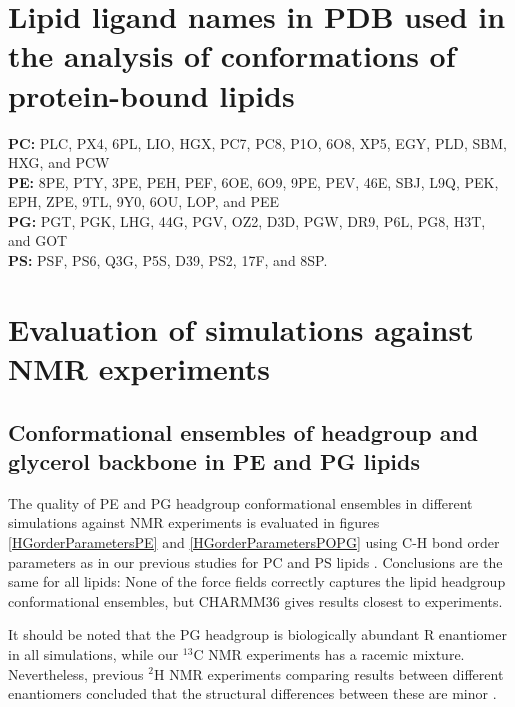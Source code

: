 \documentclass[journal=jpcbfk]{achemso}
\begin{document}
\clearpage
\section{Lipid ligand names in PDB used in the analysis of conformations of protein-bound lipids}
{\bf PC:} PLC, PX4, 6PL, LIO, HGX, PC7, PC8, P1O, 6O8, XP5, EGY, PLD, SBM, HXG, and PCW \\
{\bf PE:} 8PE, PTY, 3PE, PEH, PEF, 6OE, 6O9, 9PE, PEV, 46E, SBJ, L9Q, PEK, EPH, ZPE, 9TL, 9Y0, 6OU, LOP, and PEE \\
{\bf PG:} PGT, PGK, LHG, 44G, PGV, OZ2, D3D, PGW, DR9, P6L, PG8, H3T, and GOT \\
{\bf PS:} PSF, PS6, Q3G, P5S, D39, PS2, 17F, and 8SP.

\clearpage
\section{Evaluation of simulations against NMR experiments}
\subsection{Conformational ensembles of headgroup and glycerol backbone in PE and PG lipids}

The quality of PE and PG headgroup conformational ensembles in different simulations against NMR experiments is evaluated in figures \ref{HGorderParametersPE} and \ref{HGorderParametersPOPG} using C-H bond order parameters as in our previous studies for PC and PS lipids \cite{botan15,antila19}. Conclusions are the same for all lipids: None of the force fields correctly captures the lipid headgroup conformational ensembles, but CHARMM36 gives results closest to experiments.

It should be noted that the PG headgroup is biologically abundant R enantiomer in all simulations, while our $^{13}$C NMR experiments has a racemic mixture. Nevertheless, previous $^{2}$H NMR experiments comparing results between different enantiomers concluded that the structural differences between these are minor \cite{wohlgemuth80}.

\end{document}
